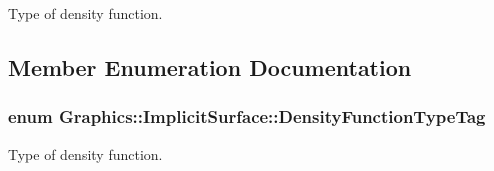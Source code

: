 Type of density function. 



\subsection{Member Enumeration Documentation}
\hypertarget{class_graphics_1_1_implicit_surface_a1dde2f9d67e9dd29c337f90d67e1fa0b}{
\subsubsection[{DensityFunctionTypeTag}]{\setlength{\rightskip}{0pt plus 5cm}enum {\bf Graphics::ImplicitSurface::DensityFunctionTypeTag}}}
\label{class_graphics_1_1_implicit_surface_a1dde2f9d67e9dd29c337f90d67e1fa0b}


Type of density function. 

